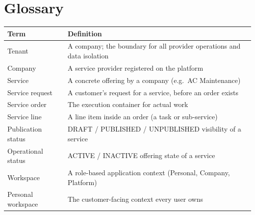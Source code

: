 \documentclass[11pt,a4paper]{article}
\begin{document}
\section{Glossary}
\label{sec:glossary}

\begin{longtable}{@{}L{4cm}L{10.4cm}@{}}
  \toprule
  \textbf{Term} & \textbf{Definition} \\
  \midrule
  \endhead
  Tenant & A company; the boundary for all provider operations and data isolation \\
  Company & A service provider registered on the platform \\
  Service & A concrete offering by a company (e.g.\ AC Maintenance) \\
  Service request & A customer's request for a service, before an order exists \\
  Service order & The execution container for actual work \\
  Service line & A line item inside an order (a task or sub-service) \\
  Publication status & DRAFT / PUBLISHED / UNPUBLISHED visibility of a service \\
  Operational status & ACTIVE / INACTIVE offering state of a service \\
  Workspace & A role-based application context (Personal, Company, Platform) \\
  Personal workspace & The customer-facing context every user owns \\
  \bottomrule
\end{longtable}
\end{document}
